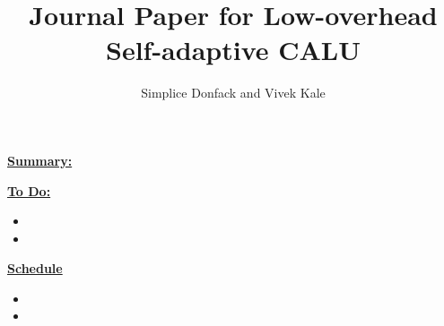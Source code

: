 \documentclass{article}
\title{Journal Paper for Low-overhead Self-adaptive CALU }
\author{Simplice Donfack and Vivek Kale}
\begin{document}
\underline{\bf Summary:} 

\underline{\bf To Do:}
\begin{itemize}
\item 
\item 
\end{itemize} 

\underline{\bf Schedule} 
\begin{itemize}
\item 
\item 
\end{itemize} 
\end{document}
